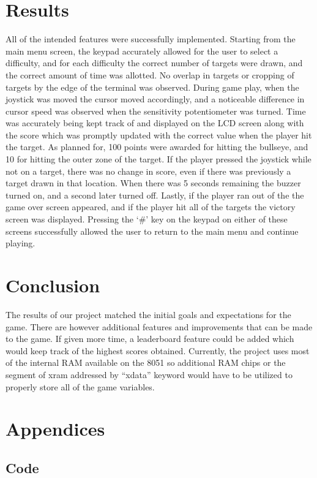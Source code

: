 \documentclass[12pt]{article}
\begin{document}
\section{Results}
All of the intended features were successfully implemented. Starting from the main menu screen, the keypad accurately allowed for the user to select a difficulty, and for each difficulty the correct number of targets were drawn, and the correct amount of time was allotted. No overlap in targets or cropping of targets by the edge of the terminal was observed. During game play, when the joystick was moved the cursor moved accordingly, and a noticeable difference in cursor speed was observed when the sensitivity potentiometer was turned. Time was accurately being kept track of and displayed on the LCD screen along with the score which was promptly updated with the correct value when the player hit the target. As planned for, 100 points were awarded for hitting the bullseye, and 10 for hitting the outer zone of the target. If the player pressed the joystick while not on a target, there was no change in score, even if there was previously a target drawn in that location. When there was 5 seconds remaining the buzzer turned on, and a second later turned off. Lastly, if the player ran out of the the game over screen appeared, and if the player hit all of the targets the victory screen was displayed. Pressing the `\#' key on the keypad on either of these screens successfully allowed the user to return to the main menu and continue playing.

\section{Conclusion}
The results of our project matched the initial goals and expectations for the game. There are however additional features and improvements that can be made to the game. If given more time, a leaderboard feature could be added which would keep track of the highest scores obtained. Currently, the project uses most of the internal RAM available on the 8051 so additional RAM chips or the segment of xram addressed by ``xdata'' keyword would have to be utilized to properly store all of the game variables.


\section{Appendices}
\subsection{Code}

\end{document}
